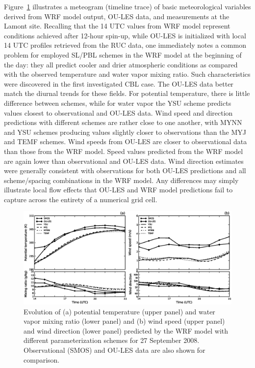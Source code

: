 Figure~\ref{figure414} illustrates a meteogram (timeline trace) of basic meteorological variables derived from WRF model output, OU-LES data, and measurements at the Lamont site. Recalling that the 14 UTC values from WRF model represent conditions achieved after 12-hour spin-up, while OU-LES is initialized with local 14 UTC profiles retrieved from the RUC data, one immediately notes a common problem for employed SL\slash PBL schemes in the WRF model at the beginning of the day: they all predict cooler and drier atmospheric conditions as compared with the observed temperature and water vapor mixing ratio. Such characteristics were discovered in the first investigated CBL case. The OU-LES data better match the diurnal trends for these fields. For potential temperature, there is little difference between schemes, while for water vapor the YSU scheme predicts values closest to observational and OU-LES data. Wind speed and direction predictions with different schemes are rather close to one another, with MYNN and YSU schemes producing values slightly closer to observations than the MYJ and TEMF schemes. Wind speeds from OU-LES are closer to observational data than those from the WRF model. Speed values predicted from the WRF model are again lower than observational and OU-LES data. Wind direction estimates were generally consistent with observations for both OU-LES predictions and all scheme\slash spacing combinations in the WRF model. Any differences may simply illustrate local flow effects that OU-LES and WRF model predictions fail to capture across the entirety of a numerical grid cell.


\begin{figure}[ht!]
\begin{center}
\includegraphics[width=\textwidth]{figures/chapter4/meteogram_phys_20080927}
\end{center}
\caption{Evolution of (a) potential temperature (upper panel) and water vapor mixing ratio (lower panel) and (b) wind speed (upper panel) and wind direction (lower panel) predicted by the WRF model with different parameterization schemes for 27 September 2008. Observational (SMOS) and OU-LES data are also shown for comparison.}
\label{figure414}
\end{figure}


